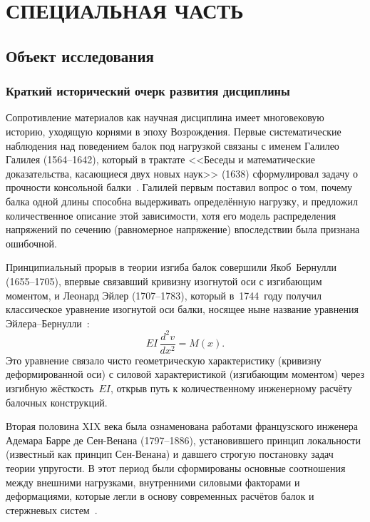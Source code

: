 \section{СПЕЦИАЛЬНАЯ ЧАСТЬ}

\subsection{Объект исследования}

\subsubsection{Краткий исторический очерк развития дисциплины}

Сопротивление материалов как научная дисциплина имеет многовековую историю, уходящую корнями в эпоху Возрождения. Первые систематические наблюдения над поведением балок под нагрузкой связаны с именем Галилео Галилея (1564--1642), который в трактате <<Беседы и математические доказательства, касающиеся двух новых наук>> (1638) сформулировал задачу о прочности консольной балки~\cite{timoshenko}. Галилей первым поставил вопрос о том, почему балка одной длины способна выдерживать определённую нагрузку, и предложил количественное описание этой зависимости, хотя его модель распределения напряжений по сечению (равномерное напряжение) впоследствии была признана ошибочной.

Принципиальный прорыв в теории изгиба балок совершили Якоб~Бернулли (1655--1705), впервые связавший кривизну изогнутой оси с изгибающим моментом, и Леонард Эйлер (1707--1783), который в~1744~году получил классическое уравнение изогнутой оси балки, носящее ныне название уравнения Эйлера--Бернулли~\cite{timoshenko, timoshenko1983}:
\[
  EI \, \frac{d^2 v}{dx^2} = M(x).
\]
Это уравнение связало чисто геометрическую характеристику (кривизну деформированной оси) с силовой характеристикой (изгибающим моментом) через изгибную жёсткость~$EI$, открыв путь к количественному инженерному расчёту балочных конструкций.

Вторая половина XIX века была ознаменована работами французского инженера Адемара Барре де Сен-Венана (1797--1886), установившего принцип локальности (известный как принцип Сен-Венана) и давшего строгую постановку задач теории упругости. В этот период были сформированы основные соотношения между внешними нагрузками, внутренними силовыми факторами и деформациями, которые легли в основу современных расчётов балок и стержневых систем~\cite{feodosev, darkov}.

